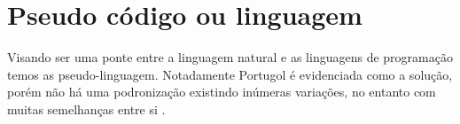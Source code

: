 \section{Pseudo código ou linguagem}

Visando ser uma ponte entre a linguagem natural e as linguagens de programação temos as pseudo-linguagem. Notadamente Portugol é evidenciada como a solução, porém não há uma podronização existindo inúmeras variações, no entanto com muitas semelhanças entre si .




